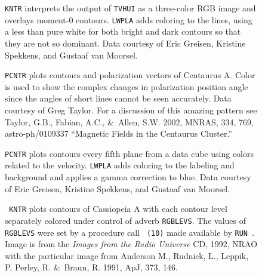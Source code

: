\begin{figure}
\centering
\centerline{}
\vspace{12pt}
\centerline{}
\caption[{\tt KNTR} shows true-color image]{{\tt KNTR} interprets the
output of {\tt TVHUI} as a three-color RGB image and overlays moment-0
contours. {\tt LWPLA} adds coloring to the lines, using a less than
pure white for both bright and dark contours so that they are not so
dominant. Data courtesy of Eric Greisen, Kristine Spekkens, and
Gustaaf van Moorsel.}
\end{figure}

\begin{figure}
\centering
\centerline{}
\vspace{12pt}
\centerline{}
\caption[{\tt PCNTR} with polarization position angle shown with
color]{{\tt PCNTR} plots contours and polarization vectors of
Centaurus A\@.  Color is used to show the complex changes in
polarization position angle since the angles of short lines cannot be
seen accurately.  Data courtesy of Greg Taylor.  For a discussion of
this amazing pattern see Taylor, G.B., Fabian, A.C., \&\ Allen, S.W.
2002, MNRAS, 334, 769, astro-ph/0109337 ``Magnetic Fields in the
Centaurus Cluster.''}
\end{figure}

\begin{figure}
\centering
\centerline{}
\vspace{12pt}
\centerline{}
\caption[{\tt PCNTR} with contours colored by velocity]{{\tt PCNTR}
plots contours every fifth plane from a data cube using colors related
to the velocity.  {\tt LWPLA} adds coloring to the labeling and
background and applies a gamma correction to blue. Data courtesy of
Eric Greisen, Kristine Spekkens, and Gustaaf van Moorsel.}
\end{figure}

\begin{figure}
\centering
\centerline{}
\vspace{12pt}
\centerline{}
\caption[{\tt KNTR} with contours colored with {\tt RGBLEVS}]{{\tt
KNTR} plots contours of Cassiopeia A with each contour level
separately colored under control of adverb {\tt RGBLEVS}\@.  The
values of {\tt RGBLEVS} were set by a procedure call {\tt
{}(10)} made available by {\tt RUN }\@.
Image is from the {\it Images from the Radio Universe} CD, 1992, NRAO
with the particular image from Anderson M., Rudnick, L., Leppik, P,
Perley, R. \&\ Braun, R. 1991, ApJ, 373, 146.}
\end{figure}

